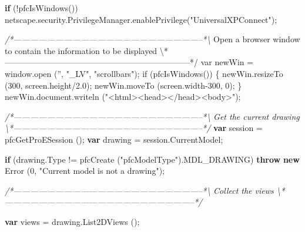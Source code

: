 \documentclass[]{article}
\newenvironment{Shaded}{}{}
\newcommand{\KeywordTok}[1]{\textcolor[rgb]{0.00,0.44,0.13}{\textbf{{#1}}}}
\newcommand{\DecValTok}[1]{\textcolor[rgb]{0.25,0.63,0.44}{{#1}}}
\newcommand{\FloatTok}[1]{\textcolor[rgb]{0.25,0.63,0.44}{{#1}}}
\newcommand{\StringTok}[1]{\textcolor[rgb]{0.25,0.44,0.63}{{#1}}}
\newcommand{\CommentTok}[1]{\textcolor[rgb]{0.38,0.63,0.69}{\textit{{#1}}}}
\newcommand{\OtherTok}[1]{\textcolor[rgb]{0.00,0.44,0.13}{{#1}}}
\newcommand{\FunctionTok}[1]{\textcolor[rgb]{0.02,0.16,0.49}{{#1}}}
\newcommand{\NormalTok}[1]{{#1}}
\begin{document}
\begin{Shaded}
\begin{Highlighting}[]
  \KeywordTok{if} \NormalTok{(!}\FunctionTok{pfcIsWindows}\NormalTok{())}
    \OtherTok{netscape}\NormalTok{.}\OtherTok{security}\NormalTok{.}\OtherTok{PrivilegeManager}\NormalTok{.}\FunctionTok{enablePrivilege}\NormalTok{(}\StringTok{"UniversalXPConnect"}\NormalTok{); }

\CommentTok{/*--------------------------------------------------------------------*\textbackslash{}}
     \NormalTok{Open a browser window to contain the information to be displayed}
\NormalTok{\textbackslash{}*--------------------------------------------------------------------*}\OtherTok{/ }
\OtherTok{  }
\OtherTok{  var newWin = window.open }\FloatTok{(}\OtherTok{'', "_LV", "scrollbars"}\FloatTok{)}\OtherTok{;}
\OtherTok{  if }\FloatTok{(}\OtherTok{pfcIsWindows}\FloatTok{())}
\OtherTok{    \{}
\OtherTok{      newWin.resizeTo }\FloatTok{(}\OtherTok{300, screen.height/2}\FloatTok{.0}\NormalTok{);}
      \OtherTok{newWin}\NormalTok{.}\FunctionTok{moveTo} \NormalTok{(}\OtherTok{screen}\NormalTok{.}\FunctionTok{width}\DecValTok{-300}\NormalTok{, }\DecValTok{0}\NormalTok{);}
    \NormalTok{\}}
  \OtherTok{newWin}\NormalTok{.}\OtherTok{document}\NormalTok{.}\FunctionTok{writeln} \NormalTok{(}\StringTok{"<html><head></head><body>"}\NormalTok{);}

\CommentTok{/*--------------------------------------------------------------------*\textbackslash{} }
\CommentTok{   Get the current drawing}
\CommentTok{\textbackslash{}*--------------------------------------------------------------------*/}
  \KeywordTok{var} \NormalTok{session = }\FunctionTok{pfcGetProESession} \NormalTok{();}
  \KeywordTok{var} \NormalTok{drawing = }\OtherTok{session}\NormalTok{.}\FunctionTok{CurrentModel}\NormalTok{;}
  
  \KeywordTok{if} \NormalTok{(}\OtherTok{drawing}\NormalTok{.}\FunctionTok{Type} \NormalTok{!= }\FunctionTok{pfcCreate} \NormalTok{(}\StringTok{"pfcModelType"}\NormalTok{).}\FunctionTok{MDL_DRAWING}\NormalTok{)}
    \KeywordTok{throw} \KeywordTok{new} \FunctionTok{Error} \NormalTok{(}\DecValTok{0}\NormalTok{, }\StringTok{"Current model is not a drawing"}\NormalTok{);}
  
\CommentTok{/*--------------------------------------------------------------------*\textbackslash{}  }
\CommentTok{  Collect the views }
\CommentTok{\textbackslash{}*--------------------------------------------------------------------*/}

  \KeywordTok{var} \NormalTok{views = }\OtherTok{drawing}\NormalTok{.}\FunctionTok{List2DViews} \NormalTok{();}
  

\end{Highlighting}
\end{Shaded}
\end{document}

